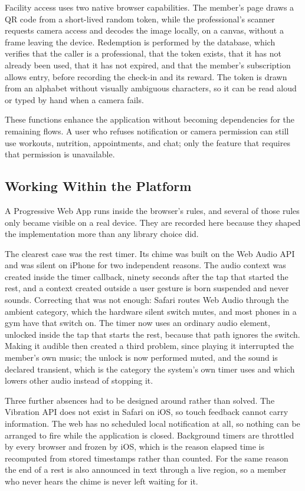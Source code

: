 Facility access uses two native browser capabilities. The member's page draws a QR code from a short-lived random token, while the professional's scanner requests camera access and decodes the image locally, on a canvas, without a frame leaving the device. Redemption is performed by the database, which verifies that the caller is a professional, that the token exists, that it has not already been used, that it has not expired, and that the member's subscription allows entry, before recording the check-in and its reward. The token is drawn from an alphabet without visually ambiguous characters, so it can be read aloud or typed by hand when a camera fails.

These functions enhance the application without becoming dependencies for the remaining flows. A user who refuses notification or camera permission can still use workouts, nutrition, appointments, and chat; only the feature that requires that permission is unavailable.

\subsection{Working Within the Platform}\label{subsect:PlatformLimits}

A Progressive Web App runs inside the browser's rules, and several of those rules only became visible on a real device. They are recorded here because they shaped the implementation more than any library choice did.

The clearest case was the rest timer. Its chime was built on the Web Audio API and was silent on iPhone for two independent reasons. The audio context was created inside the timer callback, ninety seconds after the tap that started the rest, and a context created outside a user gesture is born suspended and never sounds. Correcting that was not enough: Safari routes Web Audio through the ambient category, which the hardware silent switch mutes, and most phones in a gym have that switch on. The timer now uses an ordinary audio element, unlocked inside the tap that starts the rest, because that path ignores the switch. Making it audible then created a third problem, since playing it interrupted the member's own music; the unlock is now performed muted, and the sound is declared transient, which is the category the system's own timer uses and which lowers other audio instead of stopping it.

Three further absences had to be designed around rather than solved. The Vibration API does not exist in Safari on iOS, so touch feedback cannot carry information. The web has no scheduled local notification at all, so nothing can be arranged to fire while the application is closed. Background timers are throttled by every browser and frozen by iOS, which is the reason elapsed time is recomputed from stored timestamps rather than counted. For the same reason the end of a rest is also announced in text through a live region, so a member who never hears the chime is never left waiting for it.

